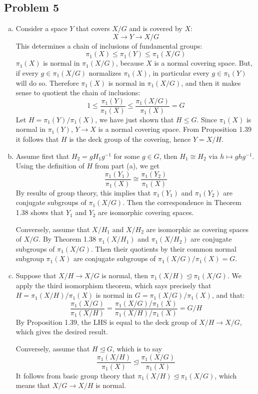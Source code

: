 \documentclass[12 pt]{article}
\begin{document}
\subsection*{Problem 5}
\begin{enumerate}[(a)]
\item Consider a space $Y$ that covers $X/G$ and is covered by $X$:
	\[        X \to Y \to X/G     \]
	This determines a chain of inclusions of fundamental groups:
	\[         \pi_1(X) \leq \pi_1(Y) \leq \pi_1(X/G)           \]
	$\pi_1(X)$ is normal in $\pi_1(X/G)$, because $X$ is a normal covering space. But, if every 
	$g \in \pi_1(X/G)$ normalizes $\pi_1(X)$, in particular every $g\in \pi_1(Y)$ will do so. Therefore 
	$\pi_1(X)$ is normal in $\pi_1(X/G)$, and then it makes sense to quotient the chain of inclusions:
	\[        1 \leq \frac{\pi_1(Y)}{ \pi_1(X)} \leq \frac{\pi_1(X/G) }{ \pi_1(X)  } = G  \]
	Let $H = \pi_1(Y) / \pi_1(X)$, we have just shown that $H \leq G$. Since $\pi_1(X)$ is normal in
	$\pi_1(Y)$, $Y \to X$ is a normal covering space. From Proposition 1.39 it follows that $H$ is the
	deck group of the covering, hence $Y = X/H$.
\item Assume first that $H_2 = gH_1g^{-1}$ for some $g\in G$, then $H_1 \cong H_2$ via 
	$h \mapsto ghg^{-1}$. Using the definition of $H$ from part (a), we get
	\[    \frac{  \pi_1(Y_1) }{\pi_1(X)} \cong \frac{\pi_1(Y_2)}{\pi_1(X)}    \]
	By results of group theory, this implies that $\pi_1(Y_1)$ and $\pi_1(Y_2)$ are conjugate subgroups
	of $\pi_1(X/G)$. Then the correspondence in Theorem 1.38 shows that $Y_1$ and $Y_2$ are
	isomorphic covering spaces.

	Conversely, assume that $X/H_1$ and $X/H_2$ are isomorphic as covering spaces of $X/G$. By
	Theorem 1.38 $\pi_1(X/H_1)$ and $ \pi_1(X/H_2)$ are conjugate subgroups of $\pi_1(X/G)$. Then
	their quotients by their common normal subgroup $\pi_1(X)$ are conjugate subgroups of
	$\pi_1(X/G) / \pi_1(X) = G$.
\item Suppose that $X/H \to X/G$ is normal, then $\pi_1(X/H) \unlhd \pi_1(X/G)$. We apply the third
	isomorphism theorem, which says precisely that $H = \pi_1(X/H) / \pi_1(X)$ is normal in 
	$G = \pi_1(X/G)/\pi_1(X)$, and that:
	\[      \frac{  \pi_1(X/G)}{\pi_1(X/H)} = \frac{ \pi_1(X/G)/\pi_1(X)}{\pi_1(X/H) / \pi_1(X)} = G/H        \]
	By Proposition 1.39, the LHS is equal to the deck group of $X/H \to X/G$, which gives the desired result.

	Conversely, assume that $H \unlhd G$, which is to say
	\[       \frac{ \pi_1(X/H)}{\pi_1(X)} \unlhd \frac{\pi_1(X/G) }{\pi_1(X)}      \]
	It follows from basic group theory that $\pi_1(X/H) \unlhd \pi_1(X/G)$, which means that $X/G \to X/H$
	is normal.
\end{enumerate}
\end{document}
